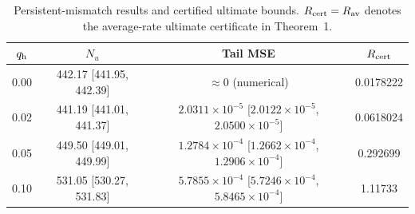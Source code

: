 \begin{table}[t]
\centering
\caption{Persistent-mismatch results and certified ultimate bounds. $R_{\rm cert}=R_{\rm av}$ denotes the average-rate ultimate certificate in Theorem~1.}
\label{tab:mismatch_final}
\small
\renewcommand{\arraystretch}{1.15}
\begin{tabular}{c c c c}
\toprule
$q_{\rm h}$ & $N_u$ & Tail MSE & $R_{\rm cert}$ \\
\midrule
0.00 & 442.17 [441.95, 442.39] & $\approx 0$ (numerical) & 0.0178222 \\
0.02 & 441.19 [441.01, 441.37] & $2.0311\times10^{-5}$ [$2.0122\times10^{-5}$, $2.0500\times10^{-5}$] & 0.0618024 \\
0.05 & 449.50 [449.01, 449.99] & $1.2784\times10^{-4}$ [$1.2662\times10^{-4}$, $1.2906\times10^{-4}$] & 0.292699 \\
0.10 & 531.05 [530.27, 531.83] & $5.7855\times10^{-4}$ [$5.7246\times10^{-4}$, $5.8465\times10^{-4}$] & 1.11733 \\
\bottomrule
\end{tabular}
\end{table}

